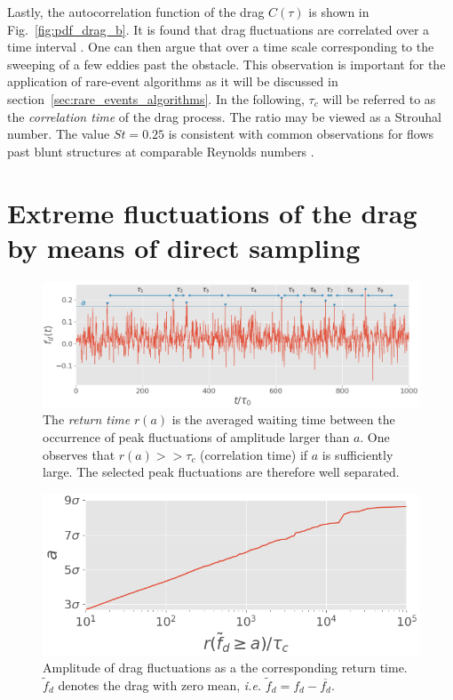 \documentclass{jfm}
\newcommand{\EL}[1]{{\color{myred}{#1}}}
\begin{document}
Lastly, the autocorrelation function of the drag $C(\tau)$ is shown in Fig.~\ref{fig:pdf_drag_b}. It is found that drag fluctuations are correlated over a time interval \EL{$\tau_c \simeq 4T_0$}. One can then argue that \EL{the drag loses its memory}  over a time scale corresponding to the sweeping of a few eddies past the obstacle.
%
This observation is important for the application of rare-event algorithms as it will be discussed in section~\ref{sec:rare_events_algorithms}.
%
In the following, $\tau_c$ will be referred to as the \textit{correlation time} of the drag process.
The ratio \EL{$T_0 / \tau_c$} may be viewed as a {Strouhal number}. The value $St=0.25$ is consistent with common observations for flows past blunt structures at comparable Reynolds numbers \citep{rodi1998}.

\section{Extreme fluctuations of the drag by means of direct sampling}
\label{sec:direct_sampling}

\begin{figure}
	\centering
	\includegraphics[width=\linewidth]{illustrate_return_time/illustrate_return_time}
	\caption{\label{fig:illustrate_return_time} {The \textit{return time} $r(a)$  is the averaged waiting time between the occurrence of peak fluctuations of amplitude larger than $a$.
			One observes that $r(a) >> \tau_c$ (correlation time) if $a$ is sufficiently large. The selected peak fluctuations are therefore well separated.}
	}
\end{figure}

\begin{figure}
	\centering
	\includegraphics[width=.6\linewidth]{return_time/return_time.png}
	\caption{Amplitude of drag fluctuations as a \EL{function of} the corresponding return time. $\tilde{f}_d$ denotes the drag with zero mean, \textit{i.e.} $\tilde{f}_d = f_d - \overline{f_d}$.
	}
	\label{fig:return_time_instant}
\end{figure}
\end{document}
